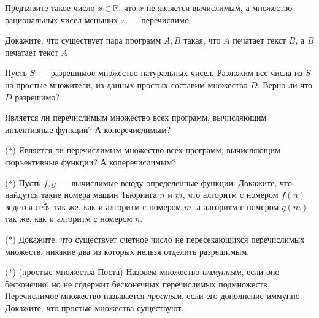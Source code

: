 \setcounter{curtask}{1}


\begin{task}
    Предъявите такое число $x \in \mathbb{R}$, что $x$ не является
    вычислимым, а множество рациональных чисел меньших $x$~---
    перечислимо.
\end{task}

\begin{task}
    Докажите, что существует пара программ $A, B$ такая, что $A$
    печатает текст $B$, а $B$ печатает текст $A$
\end{task}


\begin{task}
    Пусть $S$~--- разрешимое множество натуральных чисел. Разложим все
    числа из $S$ на простые множители, из данных простых составим
    множество $D$. Верно ли что $D$ разрешимо?
\end{task}

\begin{task}
    Является ли перечислимым множество всех программ, вычисляющим
    инъективные функции? А коперечислимым?
\end{task}


\breakline

\begin{task}(*)
    Является ли перечислимым множество всех программ, вычисляющим
    сюръективные функции? А коперечислимым?
\end{task}

\begin{task}(*)
    Пусть $f, g$~--- вычислимые всюду определенные функции. Докажите,
    что найдутся такие номера машин Тьюринга $n$ и $m$, что алгоритм с
    номером $f(n)$ ведется себя так же, как и алгоритм с номером $m$,
    а алгоритм с номером $g(m)$ так же, как и алгоритм с номером $n$.
\end{task}

\begin{task}(*)
    Докажите, что существует счетное число не пересекающихся
    перечислимых множеств, никакие два из которых нельзя отделить
    разрешимым.
\end{task}

\begin{task}(*) (простые множества Поста)
    Назовем множество {\it иммунным}, если оно бесконечно, но не
    содержит бесконечных перечислимых подмножеств. Перечислимое
    множество называется {\it простым}, если его дополнение иммунно.
    Докажите, что простые множества существуют.
\end{task}
